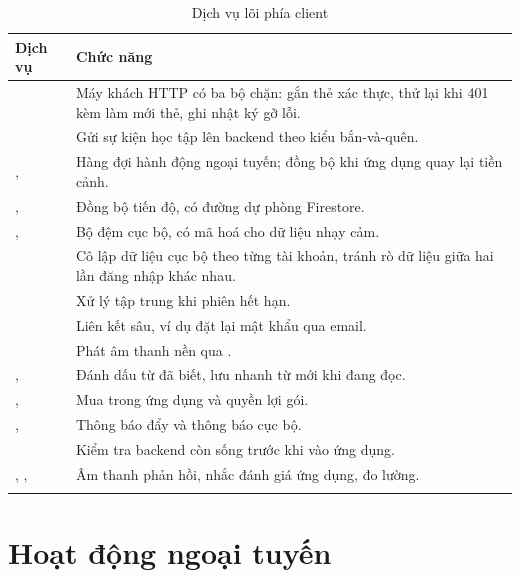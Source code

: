 \begin{longtable}{L{4.8cm} L{8.8cm}}
\toprule
\textbf{Dịch vụ} & \textbf{Chức năng}\\
\midrule
\endhead
{} & Máy khách HTTP có ba bộ chặn: gắn thẻ xác thực, thử lại khi 401 kèm làm mới thẻ, ghi nhật ký gỡ lỗi.\\
 & Gửi sự kiện học tập lên backend theo kiểu bắn-và-quên.\\
,  & Hàng đợi hành động ngoại tuyến; đồng bộ khi ứng dụng quay lại tiền cảnh.\\
,  & Đồng bộ tiến độ, có đường dự phòng Firestore.\\
,  & Bộ đệm cục bộ, có mã hoá cho dữ liệu nhạy cảm.\\
 & Cô lập dữ liệu cục bộ theo từng tài khoản, tránh rò dữ liệu giữa hai lần đăng nhập khác nhau.\\
 & Xử lý tập trung khi phiên hết hạn.\\
 & Liên kết sâu, ví dụ đặt lại mật khẩu qua email.\\
 & Phát âm thanh nền qua .\\
,  & Đánh dấu từ đã biết, lưu nhanh từ mới khi đang đọc.\\
,  & Mua trong ứng dụng và quyền lợi gói.\\
,  & Thông báo đẩy và thông báo cục bộ.\\
 & Kiểm tra backend còn sống trước khi vào ứng dụng.\\
, ,  & Âm thanh phản hồi, nhắc đánh giá ứng dụng, đo lường.\\
\bottomrule
\caption{Dịch vụ lõi phía client}
\end{longtable}

\section{Hoạt động ngoại tuyến}

